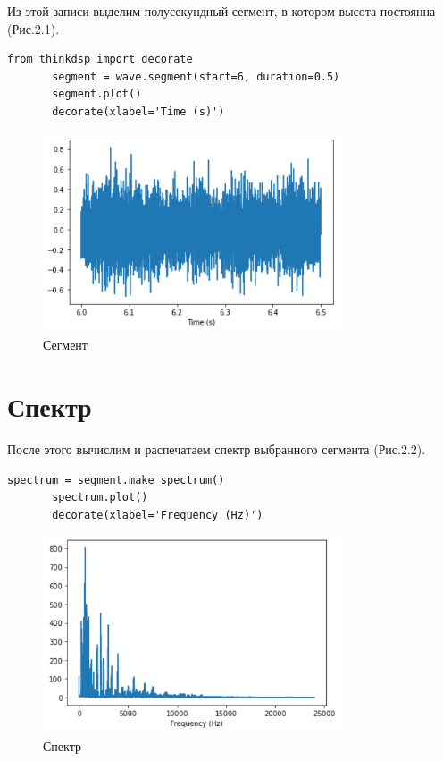 \documentclass[a4paper,12pt]{report}
\begin{document}
    Из этой записи выделим полусекундный сегмент, в котором высота постоянна (Рис.2.1).
\begin{lstlisting}[caption=Выделение сегмента]
       from thinkdsp import decorate
       segment = wave.segment(start=6, duration=0.5)
       segment.plot()
       decorate(xlabel='Time (s)')
\end{lstlisting}
\begin{figure}[H]
        \centering
        \includegraphics[width=0.8\textwidth]{fig2-1.PNG}
        \caption{Сегмент}
        \label{fig:fig2-1}
\end{figure}

\section{Спектр}
    После этого вычислим и распечатаем спектр выбранного сегмента (Рис.2.2).
\begin{lstlisting}[caption=Вычисление спектра]
       spectrum = segment.make_spectrum()
       spectrum.plot()
       decorate(xlabel='Frequency (Hz)')
\end{lstlisting}
\begin{figure}[H]
        \centering
        \includegraphics[width=0.8\textwidth]{fig2-2.PNG}
        \caption{Спектр}
        \label{fig:fig2-2}
\end{figure} 
 
\end{document}
